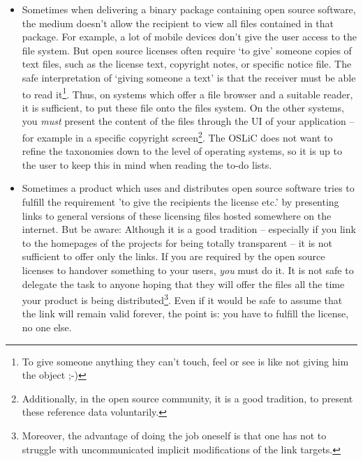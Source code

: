 \label{DistributingFilesHint}
\begin{itemize}
  \item
  Sometimes when delivering a binary package containing open source software,
  the medium doesn’t allow the recipient to view all files contained in that
  package. For example, a lot of mobile devices don’t give the user access to
  the file system. But open source licenses often require ‘to give’ someone
  copies of text files, such as the license text, copyright notes, or specific
  notice file. The safe interpretation of ‘giving someone a text’ is that the
  receiver must be able to read it\footnote{To give someone anything they can't
  touch, feel or see is like not giving him the object ;-)}. Thus, on
  systems which offer a file browser and a suitable reader, it is sufficient, to
  put these file onto the files system. On the other systems, you \emph{must}
  present the content of the files  through the UI of your application -- for
  example in a specific copyright screen\footnote{Additionally, in the open
  source community, it is a good tradition, to present these reference data
  voluntarily.}. The OSLiC does not want to refine the taxonomies down to the
  level of operating systems, so it is up to the user to keep this in mind when
  reading the to-do lists.
  
  \item Sometimes a product which uses and distributes open source software
  tries to fulfill the requirement 'to give the recipients the license etc.' by
  presenting links to general versions of these licensing files hosted somewhere
  on the internet. But be aware: Although it is a good tradition -- especially
  if you link to the homepages of the projects for being totally transparent --
  it is not sufficient to offer only the links. If you are required by the open
  source licenses to handover something to your users, \emph{you} must do it. It
  is not safe to delegate the task to anyone hoping that they will offer the
  files all the time your product is being distributed\footnote{Moreover, the
  advantage of doing the job oneself is that one has not to struggle with
  uncommunicated implicit modifications of the link targets.}. Even if it would
  be safe to assume that the link will remain valid forever, the point is: you
  have to fulfill the license, no one else.
\end{itemize}

\label{OSUCToDoLists}